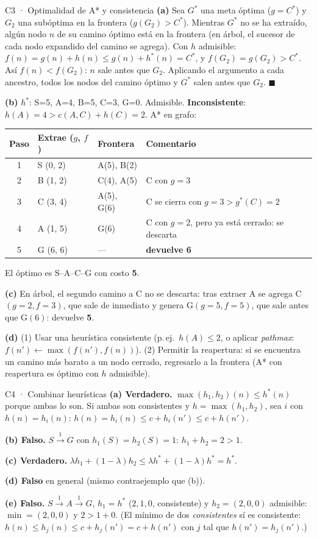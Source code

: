\begin{solucion}{C3 · Optimalidad de A* y consistencia}
\textbf{(a)} Sea $G^*$ una meta óptima ($g=C^*$) y $G_2$ una subóptima en la frontera ($g(G_2)>C^*$).
Mientras $G^*$ no se ha extraído, algún nodo $n$ de su camino óptimo está en la frontera (en árbol,
el sucesor de cada nodo expandido del camino se agrega). Con $h$ admisible:
$f(n)=g(n)+h(n)\le g(n)+h^*(n)=C^*$, y $f(G_2)=g(G_2)>C^*$. Así $f(n)<f(G_2)$: $n$ sale antes que $G_2$.
Aplicando el argumento a cada ancestro, todos los nodos del camino óptimo y $G^*$ salen antes que
$G_2$. $\blacksquare$

\textbf{(b)} $h^*$: S=5, A=4, B=5, C=3, G=0. Admisible. \textbf{Inconsistente}: $h(A)=4>c(A,C)+h(C)=2$.
A* en grafo:
\begin{center}\small
\begin{tabular}{clll}
\toprule
Paso & Extrae ($g$, $f$) & Frontera & Comentario\\
\midrule
1 & S (0, 2) & A(5), B(2) & \\
2 & B (1, 2) & C(4), A(5) & C con $g=3$\\
3 & C (3, 4) & A(5), G(6) & C se cierra con $g=3>g^*(C)=2$\\
4 & A (1, 5) & G(6) & C con $g=2$, pero ya está cerrado: se descarta\\
5 & G (6, 6) & — & \textbf{devuelve 6}\\
\bottomrule
\end{tabular}
\end{center}
El óptimo es S–A–C–G con costo \textbf{5}.

\textbf{(c)} En árbol, el segundo camino a C no se descarta: tras extraer A se agrega C$(g=2,f=3)$, que sale
de inmediato y genera G$(g=5,f=5)$, que sale antes que G$(6)$: devuelve \textbf{5}.

\textbf{(d)} (1) Usar una heurística consistente (p.\,ej.\ $h(A)\le2$, o aplicar \emph{pathmax}:
$f(n')\leftarrow\max(f(n'),f(n))$). (2) Permitir la reapertura: si se encuentra un camino más barato a
un nodo cerrado, regresarlo a la frontera (A* con reapertura es óptimo con $h$ admisible).
\end{solucion}

\begin{solucion}{C4 · Combinar heurísticas}
\textbf{(a) Verdadero.} $\max(h_1,h_2)(n)\le h^*(n)$ porque ambas lo son. Si ambas son consistentes y
$h=\max(h_1,h_2)$, sea $i$ con $h(n)=h_i(n)$: $h(n)=h_i(n)\le c+h_i(n')\le c+h(n')$.

\textbf{(b) Falso.} $S\xrightarrow{1}G$ con $h_1(S)=h_2(S)=1$: $h_1+h_2=2>1$.

\textbf{(c) Verdadero.} $\lambda h_1+(1-\lambda)h_2\le\lambda h^*+(1-\lambda)h^*=h^*$.

\textbf{(d) Falso} en general (mismo contraejemplo que (b)).

\textbf{(e) Falso.} $S\xrightarrow{1}A\xrightarrow{1}G$, $h_1=h^*$ ($2,1,0$, consistente) y $h_2=(2,0,0)$ admisible:
$\min=(2,0,0)$ y $2>1+0$. (El mínimo de dos \emph{consistentes} sí es consistente:
$h(n)\le h_j(n)\le c+h_j(n')=c+h(n')$ con $j$ tal que $h(n')=h_j(n')$.)
\end{solucion}

